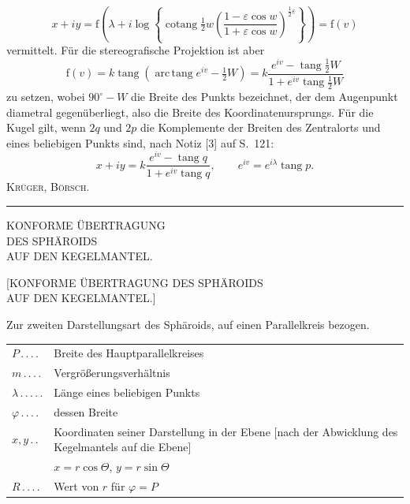 \[
x+iy=\mathrm f\left(\lambda+i\log\left\{\operatorname{cotang}\tfrac12w\left(\frac{1-\varepsilon\cos w}{1+\varepsilon\cos w}\right)^{\frac12\varepsilon}\right\}\right)=\mathrm f(v)
\]
vermittelt. Für die stereografische Projektion ist aber
\[
\mathrm f(v)=k\operatorname{tang}(\operatorname{arc\,tang}e^{iv}-\tfrac12W)=k\frac{e^{iv}-\operatorname{tang}\tfrac12W}{1+e^{iv}\operatorname{tang}\tfrac12W}
\]
zu setzen, wobei $90^\circ-W$ die Breite des Punkts bezeichnet, der dem Augenpunkt diametral gegenüberliegt, also die Breite des Koordinatenursprungs. Für die Kugel gilt, wenn $2q$ und $2p$ die Komplemente der Breiten des Zentralorts und eines beliebigen Punkts sind, nach Notiz [3] auf S.~121:
\[
x+iy=k\frac{e^{iv}-\operatorname{tang}q}{1+e^{iv}\operatorname{tang}q},\qquad e^{iv}=e^{i\lambda}\operatorname{tang}p.
\]
\hfill\textsc{Krüger, Börsch.}\par
\begin{center}\rule{.24\textwidth}{.4pt}\end{center}
\par\endgroup
\clearpage
\null\vfill
\begin{center}
{\LARGE KONFORME ÜBERTRAGUNG\\[8pt]DES SPHÄROIDS\\[8pt]AUF DEN KEGELMANTEL.}
\end{center}
\vfill\null
\clearpage
\null
\clearpage
\begin{center}
{\LARGE{}}\par\vspace{13mm}
{\large [KONFORME ÜBERTRAGUNG DES SPHÄROIDS\\AUF DEN KEGELMANTEL.]}
\end{center}
Zur zweiten Darstellungsart des Sphäroids, auf einen Parallelkreis bezogen.
\begin{center}
\begin{tabular}{@{}l@{ }p{}@{}}
$P\, .\, .\, .\, .$&Breite des Hauptparallelkreises\\[3pt]
$m\, .\, .\, .\, .$&Vergrößerungsverhältnis\\[3pt]
$\lambda\, .\, .\, .\, .\, .$&Länge eines beliebigen Punkts\\[3pt]
$\varphi\, .\, .\, .\, .$&dessen Breite\\[3pt]
$x,y\, .\, .$&Koordinaten seiner Darstellung in der Ebene [nach der Abwicklung des Kegelmantels auf die Ebene]\\
&\hspace{3em}$x=r\cos\Theta$, $y=r\sin\Theta$\\[3pt]
$R\, .\, .\, .\, .$&Wert von $r$ für $\varphi=P$
\end{tabular}
\end{center}
